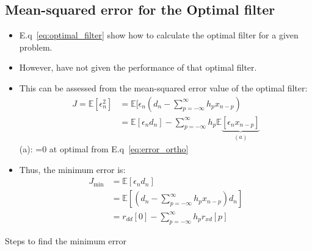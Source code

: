 \documentclass[12pt]{article}
\newcommand{\mexp}{\mathbb{E}}
\newcommand{\summ}[2]{\sum_{#1}^{#2}}
\newcommand{\sumpinfinf}{\summ{p=-\infty}{\infty}}
\newcommand{\des}{d_n}
\newcommand{\err}{\epsilon_n}
\begin{document}
\subsection{Mean-squared error for the Optimal filter}
\begin{itemize}
    \item E.q~\ref{eq:optimal_filter} show how to calculate the optimal filter for a given problem. 
    \item However, have not given the performance of that optimal filter.
    \item This can be assessed from the mean-squared error value of the optimal filter: 
    \begin{align*}
        J = \mexp[\err^2] &= \mexp[\err(d_n - \sumpinfinf h_p x_{n-p}) \\
        & = \mexp[\err\des] - \sumpinfinf h_p\mexp\underbrace{[\err x_{n-p}]}_{(a)}
    \end{align*}
    (a): =0 at optimal from E.q~\ref{eq:error_ortho}
    \item Thus, the minimum error is:
    \begin{align*}
        J_{\min} &= \mexp[\err \des] \\
        & = \mexp[(\des - \sumpinfinf h_p x_{n-p}) d_n] \\
        & = r_{dd}[0] - \sumpinfinf h_p r_{xd}[p]
    \end{align*}
\end{itemize}
Steps to find the minimum error
\end{document}
